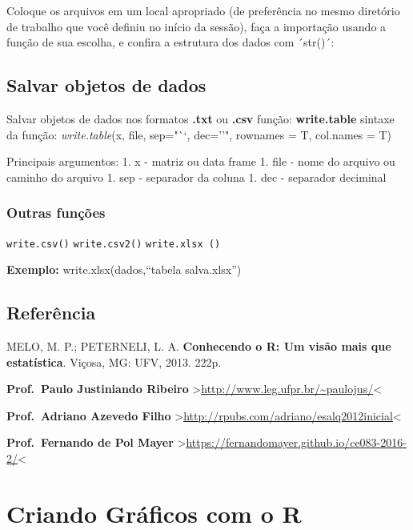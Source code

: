\documentclass[
]{book}
\begin{document}
Coloque os arquivos em um local apropriado (de preferência no mesmo diretório de trabalho que você definiu no início da sessão), faça a importação usando a função de sua escolha, e confira a estrutura dos dados com ´str()´:

\hypertarget{salvar-objetos-de-dados}{%
\section{Salvar objetos de dados}\label{salvar-objetos-de-dados}}

Salvar objetos de dados nos formatos \textbf{.txt} ou \textbf{.csv}
função: \textbf{write.table}
sintaxe da função:
\emph{write.table}(x, file, sep="``, dec=''", rownames = T, col.names = T)

Principais argumentos:
1. x - matriz ou data frame
1. file - nome do arquivo ou caminho do arquivo
1. sep - separador da coluna
1. dec - separador deciminal

\hypertarget{outras-funuxe7uxf5es}{%
\subsection{Outras funções}\label{outras-funuxe7uxf5es}}

\texttt{write.csv()}
\texttt{write.csv2()}
\texttt{write.xlsx\ ()}

\textbf{Exemplo:}
write.xlsx(dados,``tabela salva.xlsx'')

\hypertarget{referuxeancia-2}{%
\section{Referência}\label{referuxeancia-2}}

MELO, M. P.; PETERNELI, L. A. \textbf{Conhecendo o R: Um visão mais que estatística}. Viçosa, MG: UFV, 2013. 222p.

\textbf{Prof.~Paulo Justiniando Ribeiro} \textgreater{}\url{http://www.leg.ufpr.br/~paulojus/}\textless{}

\textbf{Prof.~Adriano Azevedo Filho} \textgreater{}\url{http://rpubs.com/adriano/esalq2012inicial}\textless{}

\textbf{Prof.~Fernando de Pol Mayer} \textgreater{}\url{https://fernandomayer.github.io/ce083-2016-2/}\textless{}

\hypertarget{criando-gruxe1ficos-com-o-r}{%
\chapter{Criando Gráficos com o R}\label{criando-gruxe1ficos-com-o-r}}
\end{document}
